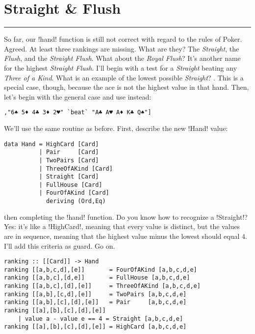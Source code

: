 \newpage
\section{Straight \& Flush} 
\vspace{10cm}
\hrule

\lhQ So far, our \il!hand! function is still not correct with regard to the rules of Poker.
\lhA Agreed. At least three rankings are missing.
\lhN What are they?
\lhA The \emph{Straight}, the \emph{Flush}, and the \emph{Straight Flush}.
\lhN What about the \emph{Royal Flush}?
\lhA It's another name for the highest \emph{Straight Flush}.
\lhN I'll begin with a test for a \emph{Straight} beating any \emph{Three of a Kind}. What is an example of the lowest possible \emph{Straight}?
\lhA {}    . This is a special case, though, because the ace is not the highest value in that hand.
\lhN Then, let's begin with the general case and use      instead:
\begin{lstlisting}[frame=single]
        ,"6♠ 5♦ 4♣ 3♦ 2♥" `beat` "A♣ A♥ A♦ K♣ Q♠"]
\end{lstlisting}
\hspace*{\fill}
\lhA \failure We'll use the same routine as before. First, describe the new \il!Hand! value:
\begin{lstlisting}[frame=single]
data Hand = HighCard [Card]
          | Pair     [Card]
          | TwoPairs [Card]
          | ThreeOfAKind [Card]
          | Straight [Card]
          | FullHouse [Card]
          | FourOfAKind [Card]
            deriving (Ord,Eq)
\end{lstlisting}
\failure then completing the \il!hand! function.
\lhN Do you know how to recognize a \il!Straight!?
\lhA \failure Yes: it's like a \il!HighCard!, meaning that every value is distinct, but the values are in sequence, meaning that the highest value minus the lowest should equal 4. I'll add this criteria as guard.
\lhN Go on.
\lhA
\begin{lstlisting}[frame=single]
ranking :: [[Card]] -> Hand
ranking [[a,b,c,d],[e]]       = FourOfAKind [a,b,c,d,e]
ranking [[a,b,c],[d,e]]       = FullHouse [a,b,c,d,e]
ranking [[a,b,c],[d],[e]]     = ThreeOfAKind [a,b,c,d,e]
ranking [[a,b],[c,d],[e]]     = TwoPairs [a,b,c,d,e]
ranking [[a,b],[c],[d],[e]]   = Pair     [a,b,c,d,e]
ranking [[a],[b],[c],[d],[e]] 
    | value a - value e == 4 = Straight [a,b,c,d,e] 
ranking [[a],[b],[c],[d],[e]] = HighCard [a,b,c,d,e] 
\end{lstlisting}
